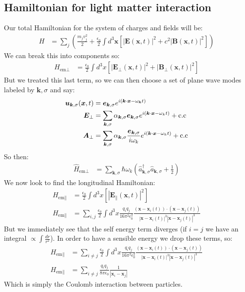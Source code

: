 \subsection{Hamiltonian for light matter interaction}
Our total Hamiltonian for the system of charges and fields will be:
\begin{align}
	H &= \sum_j \left(\frac{m_j v_j^2}{2} + \frac{\epsilon_0}{2}\int d^3\bm{x} \left[|\bm{E}(\bm{x},t)|^2 + c^2 |\bm{B}(\bm{x},t)|^2\right]\right)
\end{align}
We can break this into components so:
\begin{align*}
	H_{\text{em}\perp} &= \frac{\epsilon_0}{2}\int d^3x \left[|\bm{E}_\perp(\bm{x},t)|^2 + |\bm{B}_\perp(\bm{x},t)|^2\right]
\end{align*}
But we treated this last term, so we can then choose a set of plane wave modes labeled by $\bm{k},\sigma$ and say:
\begin{align*}
	\bm{u}_{\bm{k},\sigma}(\bm{x},t) &= \bm{e}_{\bm{k},\sigma} e^{i(\bm{k}\cdot\bm{x} - \omega_{\bm{k}} t)} \\
	\bm{E}_\perp &= \sum_{\bm{k},\sigma} \alpha_{\bm{k},\sigma} \bm{e}_{\bm{k},\sigma} e^{i(\bm{k}\cdot\bm{x} - \omega_k t)} + \text{c.c} \\
	\bm{A}_\perp &= \sum_{\bm{k},\sigma} \alpha_{\bm{k},\sigma} \frac{\bm{e}_{\bm{k},\sigma}}{i\omega_k} e^{i(\bm{k}\cdot\bm{x} - \omega_k t)} + \text{c.c}
\end{align*}
So then:
\begin{align*}
	\hat{H}_{\text{em}\perp} &= \sum_{\bm{k},\sigma} \hbar\omega_k \left(\hat{a}_{\bm{k},\sigma}^\dagger\hat{a}_{\bm{k},\sigma} + \frac{1}{2}\right)
\end{align*}
We now look to find the longitudinal Hamiltonian:
\begin{align*}
	H_{\text{em}\parallel} &= \frac{\epsilon_0}{2}\int d^3x \left[|\bm{E}_\parallel(\bm{x},t)|^2\right] \\
	H_{\text{em}\parallel} &= \sum_{i,j}\frac{\epsilon_0}{2}\int d^3x \frac{q_i q_j}{16\pi^2\epsilon_0^2} \frac{(\bm{x} - \bm{x}_i(t))\cdot(\bm{x} - \bm{x}_j(t))}{|\bm{x} - \bm{x}_i(t)|^3|\bm{x} - \bm{x}_j(t)|^3}
\end{align*}
But we immediately see that the self energy term diverges (if $i=j$ we have an integral $\propto \int \frac{dr}{r^2}$). In order to have a sensible energy we drop these terms, so:
\begin{align*}
	H_{\text{em}\parallel} &= \sum_{i\neq j}\frac{\epsilon_0}{2}\int d^3x \frac{q_i q_j}{16\pi^2\epsilon_0^2} \frac{(\bm{x} - \bm{x}_i(t))\cdot(\bm{x} - \bm{x}_j(t))}{|\bm{x} - \bm{x}_i(t)|^3|\bm{x} - \bm{x}_j(t)|^3} \\
	H_{\text{em}\parallel} &= \sum_{i\neq j}\frac{q_i q_j}{8\pi\epsilon_0}\frac{1}{|\bm{x}_i-\bm{x}_j|}
\end{align*}
Which is simply the Coulomb interaction between particles.

